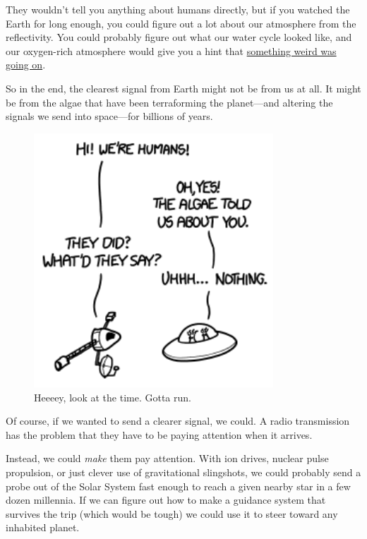 {{They wouldn’t tell you anything about humans directly, but if you watched the Earth for long enough, you could figure out a lot about our atmosphere from the reflectivity. You could probably figure out what our water cycle looked like, and our oxygen-rich atmosphere would give you a hint that \href{https://en.wikipedia.org/wiki/Great\_Oxygenation\_Event}{something weird was going on}.}

{So in the end, the clearest signal from Earth might not be from us at all. It might be from the algae that have been terraforming the planet—and altering the signals we send into space—for billions of years.}

\begin{figure}[!htbp]
\centering
\includegraphics[scale=0.5, max width=0.8\textwidth]{imgs/a/47/life_humans.png}
\caption{Heeeey, look at the time. Gotta run.}
\end{figure}

{Of course, if we wanted to send a clearer signal, we could. A radio transmission has the problem that they have to be paying attention when it arrives.}

{Instead, we could \emph{make} them pay attention. With ion drives, nuclear pulse propulsion, or just clever use of gravitational slingshots, we could probably send a probe out of the Solar System fast enough to reach a given nearby star in a few dozen millennia. If we can figure out how to make a guidance system that survives the trip (which would be tough) we could use it to steer toward any inhabited planet.}

}
